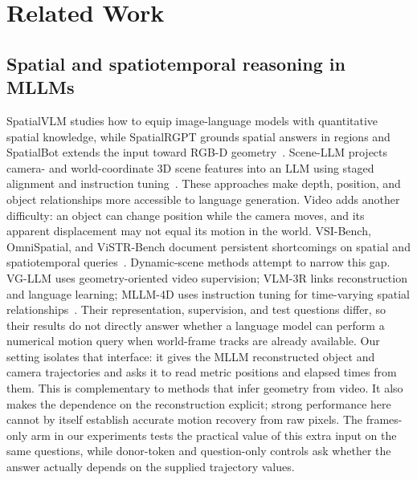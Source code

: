 \section{Related Work}
\label{sec:related}

\subsection{Spatial and spatiotemporal reasoning in MLLMs}
SpatialVLM studies how to equip image-language models with quantitative spatial knowledge, while SpatialRGPT grounds spatial answers in regions and SpatialBot extends the input toward RGB-D geometry~\citep{chenSpatialVLMEndowingVisionLanguage2024,chengSpatialRGPTGroundedSpatial2024,caiSpatialBotPreciseSpatial2025}. Scene-LLM projects camera- and world-coordinate 3D scene features into an LLM using staged alignment and instruction tuning~\citep{fuSceneLLMExtending2025}. These approaches make depth, position, and object relationships more accessible to language generation. Video adds another difficulty: an object can change position while the camera moves, and its apparent displacement may not equal its motion in the world. VSI-Bench, OmniSpatial, and ViSTR-Bench document persistent shortcomings on spatial and spatiotemporal queries~\citep{yangThinkingSpaceHow2025,jiaOmniSpatialComprehensiveSpatial2026,liViSTRBenchCanMLLMs2026}. Dynamic-scene methods attempt to narrow this gap. VG-LLM uses geometry-oriented video supervision; VLM-3R links reconstruction and language learning; MLLM-4D uses instruction tuning for time-varying spatial relationships~\citep{zhengLearningVideos3D2025,fanVLM3RVisionLanguageModels2026,yinMLLM4DVisualbasedSpatialTemporal2026}. Their representation, supervision, and test questions differ, so their results do not directly answer whether a language model can perform a numerical motion query when world-frame tracks are already available. Our setting isolates that interface: it gives the MLLM reconstructed object and camera trajectories and asks it to read metric positions and elapsed times from them. This is complementary to methods that infer geometry from video. It also makes the dependence on the reconstruction explicit; strong performance here cannot by itself establish accurate motion recovery from raw pixels. The frames-only arm in our experiments tests the practical value of this extra input on the same questions, while donor-token and question-only controls ask whether the answer actually depends on the supplied trajectory values.

